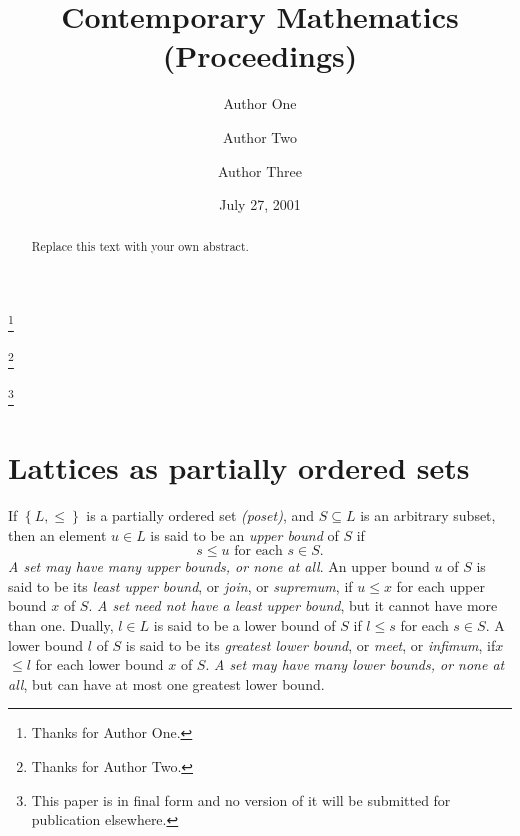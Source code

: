 \documentclass{conm-p-l}
\theoremstyle{definition}
\theoremstyle{remark}
\numberwithin{equation}{section}
\theoremstyle{plain}
\begin{document}
\title[Short Title]{Contemporary Mathematics (Proceedings)}
\author{Author One}
\address[A. One and A. Two]{Author OneTwo address line 1\\
Author OneTwo address line 2}
\thanks{Thanks for Author One.}
\author{Author Two}
\thanks{Thanks for Author Two.}
\author{Author Three}
\address[A. Three]{Author Three address line 1\\
Author Three address line 2}
\thanks{This paper is in final form and no version of it will be submitted
for publication elsewhere.}
\date{July 27, 2001}

\begin{abstract}
Replace this text with your own abstract.
\end{abstract}

\maketitle

\section{Lattices as partially ordered sets}

If $\left\{ L,\leq \right\} $ is a partially ordered set \emph{(poset)}, and 
$S\subseteq L$ is an arbitrary subset, then an element $u\in L$ is said to
be an \emph{upper bound} of $S$ if 
\begin{equation}
s\leq u\text{ for each }s\in S.
\end{equation}
\emph{A set may have many upper bounds, or none at all}. An upper bound $u$
of $S$ is said to be its \emph{least upper bound}, or \emph{join}, or \emph{%
supremum}, if $u\leq x$ for each upper bound $x$ of $S$. \emph{A set need
not have a least upper bound}, but it cannot have more than one. Dually, $%
l\in L$ is said to be a lower bound of $S$ if $l\leq s$ for each $s\in S$. A
lower bound $l$ of $S$ is said to be its \emph{greatest lower bound}, or 
\emph{meet}, or \emph{infimum}, if$x$ $\leq l$ for each lower bound $x$ of $S
$. \emph{A set may have many lower bounds, or none at all}, but can have at
most one greatest lower bound.
\end{document}
